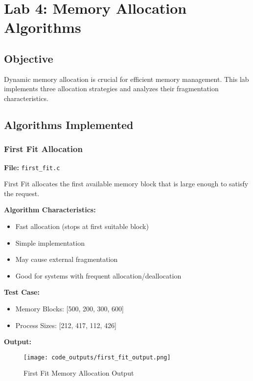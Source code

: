 \documentclass[12pt,a4paper]{article}
\begin{document}
\vspace{2cm}

\section{Lab 4: Memory Allocation Algorithms}

\subsection{Objective}
Dynamic memory allocation is crucial for efficient memory management. This lab implements three allocation strategies and analyzes their fragmentation characteristics.

\subsection{Algorithms Implemented}

\subsubsection{First Fit Allocation}
\textbf{File:} \texttt{first\_fit.c}

First Fit allocates the first available memory block that is large enough to satisfy the request.

\textbf{Algorithm Characteristics:}
\begin{itemize}
    \item Fast allocation (stops at first suitable block)
    \item Simple implementation
    \item May cause external fragmentation
    \item Good for systems with frequent allocation/deallocation
\end{itemize}

\textbf{Test Case:}
\begin{itemize}
    \item Memory Blocks: [500, 200, 300, 600]
    \item Process Sizes: [212, 417, 112, 426]
\end{itemize}

\textbf{Output:}
\begin{figure}[H]
    \centering
    \texttt{[image: code\_outputs/first\_fit\_output.png]}
    \caption{First Fit Memory Allocation Output}
    \label{fig:first_fit_output}
\end{figure}
\end{document}
